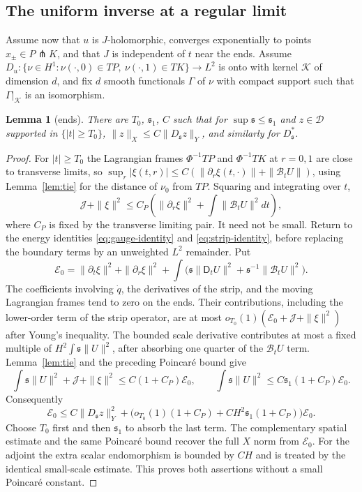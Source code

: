 \documentclass[11pt]{amsart}
\newtheorem{lemma}[theorem]{Lemma}
\theoremstyle{definition}
\theoremstyle{remark}
\theoremstyle{plain}
\numberwithin{equation}{section}
\begin{document}
\subsection{The uniform inverse at a regular limit}\label{subsec:uniform-inverse}

Assume now that $u$ is $J$-holomorphic, converges exponentially to
points $x_\pm\in P\pitchfork K$, and that $J$ is independent of $t$ near
the ends. Assume
$D_u\colon\{\nu\in H^1:\nu(\cdot,0)\in TP,\ \nu(\cdot,1)\in TK\}\to L^2$
is onto with kernel $\mathcal K$ of dimension $d$, and fix $d$ smooth
functionals $\Gamma$ of $\nu$ with compact support such that
$\Gamma|_{\mathcal K}$ is an isomorphism.

\begin{lemma}[ends]\label{lem:ends}
There are $T_0$, ${\mathfrak s}_1$, $C$ such that for $\sup{\mathfrak s}\le{\mathfrak s}_1$ and
$z\in\mathcal D$ supported in $\{|t|\ge T_0\}$,
$\|z\|_X\le C\|D_{\mathfrak s} z\|_Y$, and similarly for $D_{\mathfrak s}^*$.
\end{lemma}

\begin{proof}
For $|t|\ge T_0$ the Lagrangian frames $\Phi^{-1}TP$ and $\Phi^{-1}TK$
at $r=0,1$ are close to transverse limits, so
$\sup_r|\xi(t,r)|\le C(\|\partial_r\xi(t,\cdot)\|+\|\mathcal B_tU\|)$,
using Lemma~\ref{lem:tie} for the distance of $\nu_0$ from $TP$. Squaring and
integrating over $t$,
\[
\mathcal J+\|\xi\|^2\le C_P\left(\|\partial_r\xi\|^2+\int\|\mathcal B_tU\|^2dt\right),
\]
where $C_P$ is fixed by the transverse limiting pair. It need not be small.
Return to the energy identities \eqref{eq:gauge-identity} and
\eqref{eq:strip-identity}, before replacing the boundary terms by an
unweighted $L^2$ remainder. Put
\[
\mathcal E_0=\|\partial_t\xi\|^2+\|\partial_r\xi\|^2+
\int\bigl({\mathfrak s}\|\mathsf D_tU\|^2+
{\mathfrak s}^{-1}\|\mathcal B_tU\|^2\bigr).
\]
The coefficients involving $\dot q$, the derivatives of the strip, and
the moving Lagrangian frames tend to zero on the ends. Their contributions,
including the lower-order term of the strip operator, are at most
$o_{T_0}(1)(\mathcal E_0+\mathcal J+\|\xi\|^2)$ after Young's inequality.
The bounded scale derivative contributes at most a fixed multiple of
$H^2\int{\mathfrak s}\|U\|^2$, after absorbing one quarter of the
$\mathcal B_tU$ term. Lemma~\ref{lem:tie} and the preceding Poincar\'e bound give
\[
\int{\mathfrak s}\|U\|^2+
\mathcal J+\|\xi\|^2\le C(1+C_P)\mathcal E_0,
\qquad
\int{\mathfrak s}\|U\|^2\le C{\mathfrak s}_1(1+C_P)\mathcal E_0.
\]
Consequently
\[
\mathcal E_0\le C\|D_{\mathfrak s}z\|_Y^2+
\bigl(o_{T_0}(1)(1+C_P)+C H^2{\mathfrak s}_1(1+C_P)\bigr)\mathcal E_0.
\]
Choose $T_0$ first and then ${\mathfrak s}_1$ to absorb the last term.
The complementary spatial estimate and the same Poincar\'e bound recover
the full $X$ norm from $\mathcal E_0$. For the adjoint the extra scalar
endomorphism is bounded by $CH$ and is treated by the identical small-scale
estimate. This proves both assertions without a small Poincar\'e constant.
\end{proof}
\end{document}

